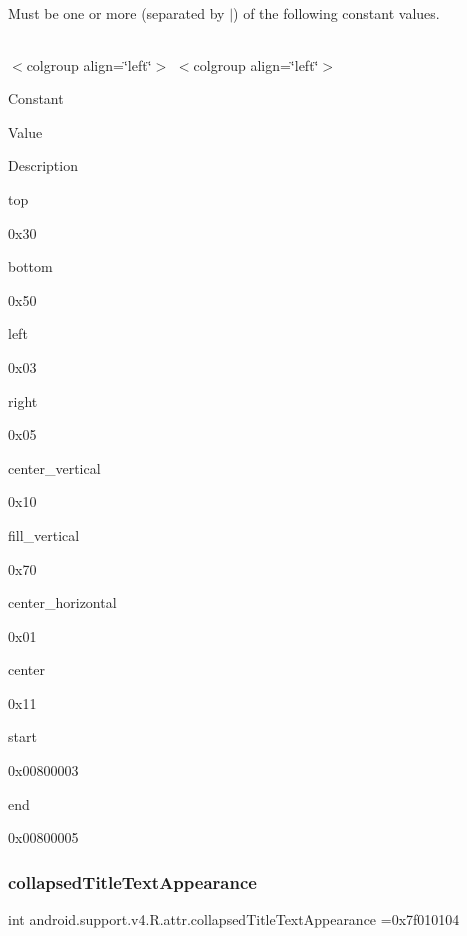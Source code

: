 Must be one or more (separated by \textquotesingle{}$\vert$\textquotesingle{}) of the following constant values.

\tabulinesep=1mm
\begin{longtabu} spread 0pt [c]{*{0}{|X[-1]}|}
\hline
\end{longtabu}
$<$colgroup align=\char`\"{}left\char`\"{}$>$ $<$colgroup align=\char`\"{}left\char`\"{}$>$ 

Constant

Value

Description 

{\ttfamily top}

0x30

{\ttfamily bottom}

0x50

{\ttfamily left}

0x03

{\ttfamily right}

0x05

{\ttfamily center\+\_\+vertical}

0x10

{\ttfamily fill\+\_\+vertical}

0x70

{\ttfamily center\+\_\+horizontal}

0x01

{\ttfamily center}

0x11

{\ttfamily start}

0x00800003

{\ttfamily end}

0x00800005\mbox{\label{classandroid_1_1support_1_1v4_1_1R_1_1attr_afc1849f3f9d23c04cc29badfeb12f1f9}} 
\subsubsection{\texorpdfstring{collapsed\+Title\+Text\+Appearance}{collapsedTitleTextAppearance}}
{\footnotesize\ttfamily int android.\+support.\+v4.\+R.\+attr.\+collapsed\+Title\+Text\+Appearance =0x7f010104\hspace{0.3cm}{\ttfamily [static]}}

